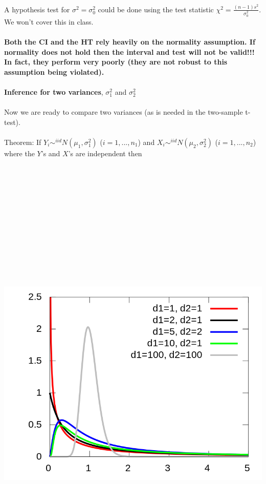 \newpage

A hypothesis test for $\sigma^2=\sigma^2_0$ could be done using the test statistic $\chi^2 = \frac{(n-1)s^2}{\sigma^2_0}$.  We won't cover this in class.\\~\\

\textbf{Both the CI and the HT rely heavily on the normality assumption.  If normality does not hold then the interval and test will not be valid!!!  In fact, they perform very poorly (they are not robust to this assumption being violated).}\\~\\


\large \textbf{Inference for two variances}, $\sigma^2_1$ and $\sigma^2_2$ \normalsize\\~\\
Now we are ready to compare two variances (as is needed in the two-sample t-test).  \\~\\
Theorem:  If $Y_i\sim^{iid}N(\mu_1,\sigma^2_1)$ ($i=1,...,n_1$) and $X_i\sim^{iid}N(\mu_2,\sigma^2_2)$ ($i=1,...,n_2$) where the $Y$'s and $X$'s are independent then\\~\\~\\~\\~\\~\\~\\~\\~\\~\\~\\~\\~\\

\begin{flushleft}
\includegraphics[scale=0.3]{fdist}
\end{flushleft}~\\

